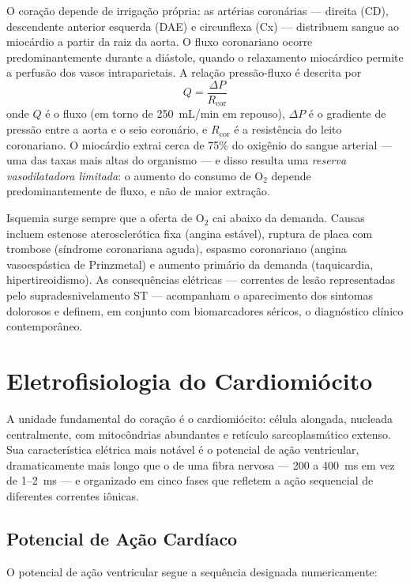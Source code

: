 O coração depende de irrigação própria: as artérias coronárias --- direita
(CD), descendente anterior esquerda (DAE) e circunflexa (Cx) --- distribuem
sangue ao miocárdio a partir da raiz da aorta. O fluxo coronariano ocorre
predominantemente durante a diástole, quando o relaxamento miocárdico
permite a perfusão dos vasos intraparietais. A relação pressão-fluxo é
descrita por
\begin{equation}
Q = \frac{\Delta P}{R_{\mathrm{cor}}}
\end{equation}
onde $Q$ é o fluxo (em torno de 250~mL/min em repouso), $\Delta P$ é o
gradiente de pressão entre a aorta e o seio coronário, e $R_{\mathrm{cor}}$
é a resistência do leito coronariano. O miocárdio extrai cerca de 75\% do
oxigênio do sangue arterial --- uma das taxas mais altas do organismo --- e
disso resulta uma \emph{reserva vasodilatadora limitada}: o aumento do
consumo de O$_2$ depende predominantemente de fluxo, e não de maior
extração.

Isquemia surge sempre que a oferta de O$_2$ cai abaixo da demanda.
Causas incluem estenose aterosclerótica fixa (angina estável), ruptura
de placa com trombose (síndrome coronariana aguda), espasmo coronariano
(angina vasoespástica de Prinzmetal) e aumento primário da demanda
(taquicardia, hipertireoidismo). As consequências elétricas ---
correntes de lesão representadas pelo supradesnivelamento ST --- acompanham
o aparecimento dos sintomas dolorosos e definem, em conjunto com
biomarcadores séricos, o diagnóstico clínico contemporâneo.


\section{Eletrofisiologia do Cardiomiócito}
\label{sec:12-eletrofisiologia}

A unidade fundamental do coração é o cardiomiócito: célula alongada,
nucleada centralmente, com mitocôndrias abundantes e retículo sarcoplasmático
extenso. Sua característica elétrica mais notável é o potencial de ação
ventricular, dramaticamente mais longo que o de uma fibra nervosa ---
200 a 400~ms em vez de 1--2~ms --- e organizado em cinco fases que
refletem a ação sequencial de diferentes correntes iônicas.

\subsection{Potencial de Ação Cardíaco}
\label{sub:image12-pa}

O potencial de ação ventricular segue a sequência designada numericamente:


